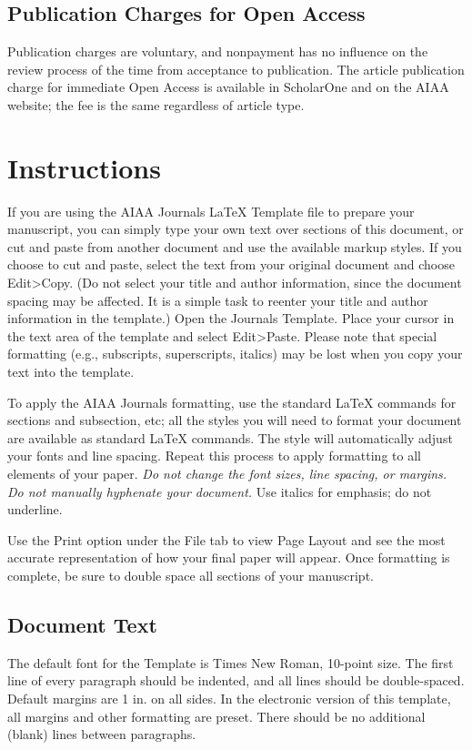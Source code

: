 \documentclass[journal ]{new-aiaa}
\begin{document}
\subsection{Publication Charges for Open Access}

Publication charges are voluntary, and nonpayment has no influence on the review process of the time from acceptance to publication. The article publication charge for immediate Open Access is available in ScholarOne and on the AIAA website; the fee is the same regardless of article type.


\section{Instructions}

If you are using the AIAA Journals \LaTeX{} Template file to prepare your manuscript, you can simply type your own text over sections of this document, or cut and paste from another document and use the available markup styles. If you choose to cut and paste, select the text from your original document and choose Edit>Copy. (Do not select your title and author information, since the document spacing may be affected. It is a simple task to reenter your title and author information in the template.) Open the Journals Template. Place your cursor in the text area of the template and select Edit>Paste. Please note that special formatting (e.g., subscripts, superscripts, italics) may be lost when you copy your text into the template.

To apply the AIAA Journals formatting, use the standard \LaTeX{} commands for sections and subsection, etc; all the styles you will need to format your document are available as standard \LaTeX{} commands. The style will automatically adjust your fonts and line spacing. Repeat this process to apply formatting to all elements of your paper. \emph{Do not change the font sizes, line spacing, or margins. Do not manually hyphenate your document.} Use italics for emphasis; do not underline. 

Use the Print option under the File tab to view Page Layout and see the most accurate representation of how your final paper will appear. Once formatting is complete, be sure to double space all sections of your manuscript.


\subsection{Document Text}
The default font for the Template is Times New Roman, 10-point size. The first line of every paragraph should be indented, and all lines should be double-spaced. Default margins are 1 in. on all sides. In the electronic version of this template, all margins and other formatting are preset. There should be no additional (blank) lines between paragraphs.
\end{document}
